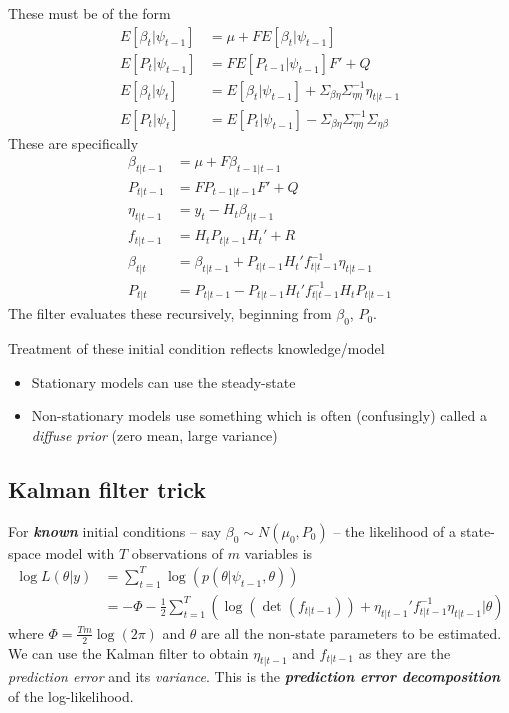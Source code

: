 \documentclass[
  letterpaper,
]{book}
\providecommand{\tightlist}{%
  \setlength{\itemsep}{0pt}\setlength{\parskip}{0pt}}\usepackage{longtable,booktabs,array}
\begin{document}
These must be of the form \begin{align}
E[\beta_t | \psi_{t-1}] &= \mu + F E [\beta_t | \psi_{t-1}] \\
E[P_t|\psi_{t-1}]       &= F E[P_{t-1}|\psi_{t-1}] F' + Q \\
E[\beta_t | \psi_t]     &= E[\beta_t|\psi_{t-1}] + \Sigma_{\beta\eta} \Sigma_{\eta\eta}^{-1}\eta_{t|t-1} \\
E[P_t|\psi_t]           &= E[P_t|\psi_{t-1}] -\Sigma_{\beta\eta}\Sigma_{\eta\eta}^{-1}\Sigma_{\eta \beta}
\end{align} These are specifically \begin{align}
\beta_{t|t-1} &= \mu +F\beta_{t-1|t-1}                                  \tag{Predicted $\beta$}\\
P_{t|t-1}     &= F P_{t-1|t-1}F' + Q                                    \tag{Predicted $P$}\\
\eta_{t|t-1}  &= y_t-H_t\beta_{t|t-1}                                   \tag{Prediction error}\\
f_{t|t-1}     &= H_t P_{t|t-1}H_t' + R                                  \tag{Pred. err. variance}\\
\beta_{t|t}   &= \beta_{t|t-1}+P_{t|t-1}H_t' f_{t|t-1}^{-1}\eta_{t|t-1} \tag{Updated $\beta$}\\
P_{t|t}       &= P_{t|t-1} - P_{t|t-1}H_t' f_{t|t-1}^{-1}H_tP_{t|t-1}   \tag{Updated $P$}
\end{align} The filter evaluates these recursively, beginning from
\(\beta_0\), \(P_0\).

Treatment of these initial condition reflects knowledge/model

\begin{itemize}
\tightlist
\item
  Stationary models can use the steady-state
\item
  Non-stationary models use something which is often (confusingly)
  called a \emph{diffuse prior} (zero mean, large variance)
\end{itemize}

\hypertarget{kalman-filter-trick}{%
\subsection{Kalman filter trick}\label{kalman-filter-trick}}

For \textbf{\emph{known}} initial conditions -- say
\(\beta_0 \sim N(\mu_0, P_0)\) -- the likelihood of a state-space model
with \(T\) observations of \(m\) variables is \begin{align}
\log L(\theta | y) &= \sum_{t=1}^T \log \left(p \left( \theta | \psi_{t-1}, \theta \right)\right) \\
  &= - \Phi - \frac{1}{2}\sum_{t=1}^T \left( \log(\det(f_{t|t-1})) + \eta_{t|t-1}' f_{t|t-1}^{-1} \eta_{t|t-1} | \theta \right)
\end{align} where \(\Phi = \frac{Tm}{2}\log \left( 2\pi \right)\) and
\(\theta\) are all the non-state parameters to be estimated. We can use
the Kalman filter to obtain \(\eta_{t|t-1}\) and \(f_{t|t-1}\) as they
are the \emph{prediction error} and its \emph{variance}. This is the
\textbf{\emph{prediction error decomposition}} of the log-likelihood.
\end{document}

